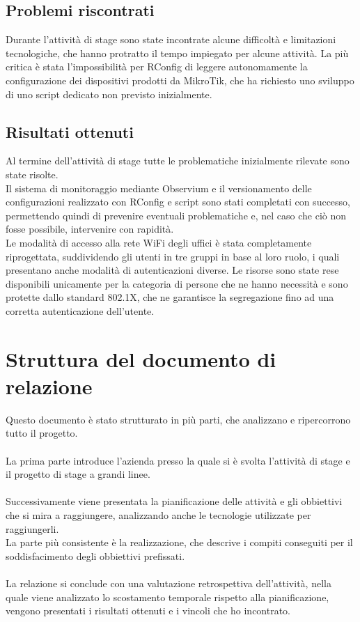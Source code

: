 \documentclass[Tesi.tex]{subfiles}
\begin{document}
\subsection{Problemi riscontrati}
Durante l'attività di stage sono state incontrate alcune difficoltà e limitazioni tecnologiche, che hanno protratto il tempo impiegato per alcune attività. La più critica è stata l'impossibilità per RConfig di leggere autonomamente la configurazione dei dispositivi prodotti da MikroTik, che ha richiesto uno sviluppo di uno script dedicato non previsto inizialmente.

\subsection{Risultati ottenuti}
Al termine dell'attività di stage tutte le problematiche inizialmente rilevate sono state risolte. \\
Il sistema di monitoraggio mediante Observium e il versionamento delle configurazioni realizzato con RConfig e script sono stati completati con successo, permettendo quindi di prevenire eventuali problematiche e, nel caso che ciò non fosse possibile, intervenire con rapidità.\\
Le modalità di accesso alla rete WiFi degli uffici è stata completamente riprogettata, suddividendo gli utenti in tre gruppi in base al loro ruolo, i quali presentano anche modalità di autenticazioni diverse. Le risorse sono state rese disponibili unicamente per la categoria di persone che ne hanno necessità e sono protette dallo standard 802.1X, che ne garantisce la segregazione fino ad una corretta autenticazione dell'utente.

\section{Struttura del documento di relazione}
Questo documento è stato strutturato in più parti, che analizzano e ripercorrono tutto il progetto.\\\\
La prima parte introduce l'azienda presso la quale si è svolta l'attività di stage e il progetto di stage a grandi linee. \\\\
Successivamente viene presentata la pianificazione delle attività e gli obbiettivi che si mira a raggiungere, analizzando anche le tecnologie utilizzate per raggiungerli. \\
La parte più consistente è la realizzazione, che descrive i compiti conseguiti per il soddisfacimento degli obbiettivi prefissati. \\\\
La relazione si conclude con una valutazione retrospettiva dell'attività, nella quale viene analizzato lo scostamento temporale rispetto alla pianificazione, vengono presentati i risultati ottenuti e i vincoli che ho incontrato.
\end{document}
